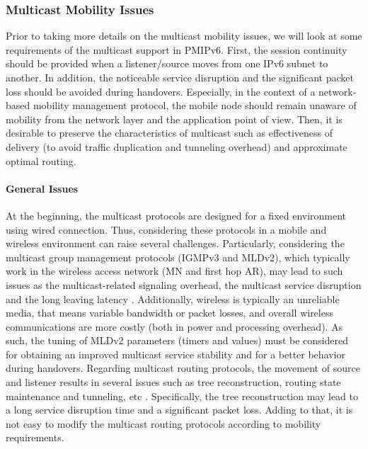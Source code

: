 \subsubsection{Multicast Mobility Issues}
Prior to taking more details on the multicast mobility issues, we will look at some requirements of the multicast support in PMIPv6. First, the session continuity should be provided when a listener/source moves from one IPv6 subnet to another. In addition, the noticeable service disruption and the significant packet loss should be avoided during handovers. Especially, in the context of a network-based mobility management protocol, the mobile node should remain unaware of mobility from the network layer and the application point of view. Then, it is desirable to preserve the characteristics of multicast such as effectiveness of delivery (to avoid traffic duplication and tunneling overhead) and approximate optimal routing. 

\paragraph{General Issues}
At the beginning, the multicast protocols are designed for a fixed environment using wired connection. Thus, considering these protocols in a mobile and wireless environment can raise several challenges. Particularly, considering the multicast group management protocols (IGMPv3 and MLDv2), which typically work in the wireless access network (MN and first hop AR), may lead to such issues as the multicast-related signaling overhead, the multicast service disruption and the long leaving latency \cite{tuning_MLD}. Additionally, wireless is typically an unreliable media, that means variable bandwidth or packet losses, and overall wireless communications are more costly (both in power and processing overhead). As such, the tuning of MLDv2 parameters (timers and values) \cite{tuning_MLD} must be considered for obtaining an improved multicast service stability and for a better behavior during handovers. Regarding multicast routing protocols, the movement of source and listener results in several issues such as tree reconstruction, routing state maintenance and tunneling, etc \cite{multicast_challenges_solutions}. Specifically, the tree reconstruction may lead to a long service disruption time and a significant packet loss. Adding to that, it is not easy to modify the multicast routing protocols according to mobility requirements. 

